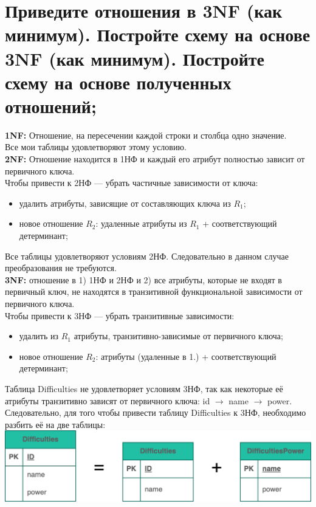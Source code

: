 \documentclass[12pt,onecolumn]{article}
\begin{document}
\section{Приведите отношения в 3NF (как минимум). Постройте схему на основе 3NF (как минимум). Постройте схему на основе
полученных отношений;}
\textbf{1NF:} Отношение, на пересечении каждой строки и столбца одно значение.\\
Все мои таблицы удовлетворяют этому условию.\\
\textbf{2NF:} Отношение находится в 1НФ и каждый его атрибут полностью зависит от первичного ключа.\\
Чтобы привести к 2НФ — убрать частичные зависимости от ключа:
\begin{itemize}
  \item удалить атрибуты, зависящие от составляющих ключа из $R_1$;
  \item новое отношение $R_2$: удаленные атрибуты из $R_1$ + соответствующий детерминант;
\end{itemize}
Все таблицы удовлетворяют условиям 2НФ. Следовательно в данном случае преобразования не требуются.\\
\textbf{3NF:} отношение в 1) 1НФ и 2НФ и 2) все атрибуты, которые не входят в первичный ключ, не находятся в транзитивной функциональной зависимости от первичного ключа.\\
Чтобы привести к 3НФ — убрать транзитивные зависимости:
\begin{itemize}
  \item удалить из $R_1$ атрибуты, транзитивно-зависимые от первичного ключа;
  \item новое отношение $R_2$: атрибуты (удаленные в 1.) + соответствующий детерминант;
\end{itemize}
Таблица Difficulties не удовлетворяет условиям 3НФ, так как некоторые её атрибуты транзитивно зависят от первичного ключа: id $\to$ name $\to$ power.\\
Следовательно, для того чтобы привести таблицу Difficulties к 3НФ, необходимо разбить её на две таблицы:\\
\includegraphics[width=\textwidth]{image/lab2.png}
\end{document}
